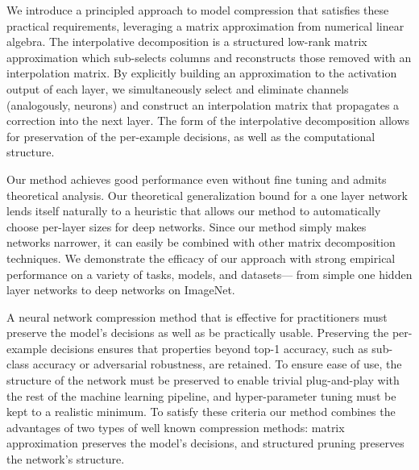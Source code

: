 We introduce a principled approach to model compression that satisfies these practical requirements, leveraging a matrix approximation from numerical linear algebra.
The interpolative decomposition is a structured low-rank matrix approximation which sub-selects columns and reconstructs those removed with an interpolation matrix.
By explicitly building an approximation to the activation output of each layer, we simultaneously select and eliminate channels (analogously, neurons) and construct an interpolation matrix that propagates a correction into the next layer.  
The form of the interpolative decomposition allows for preservation of the per-example decisions, as well as the computational structure. 

Our method achieves good performance even without fine tuning and admits theoretical analysis.  
Our theoretical generalization bound for a one layer network lends itself naturally to a heuristic that allows our method to automatically choose per-layer sizes for deep networks. 
Since our method simply makes networks narrower, it can easily be combined with other matrix decomposition techniques. 
We demonstrate the efficacy of our approach with strong empirical performance on a variety of tasks, models, and datasets--- from simple one hidden layer networks to deep networks on ImageNet. 


A neural network compression method that is effective for practitioners must preserve the model's decisions as well as be practically usable.
Preserving the per-example decisions ensures that properties beyond top-1 accuracy, such as sub-class accuracy or adversarial robustness, are retained.
To ensure ease of use, the structure of the network must be preserved to enable trivial plug-and-play with the rest of the machine learning pipeline, and hyper-parameter tuning must be kept to a realistic minimum.
To satisfy these criteria our method combines the advantages of two types of well known compression methods: matrix approximation preserves the model's decisions, and structured pruning preserves the network's structure.



